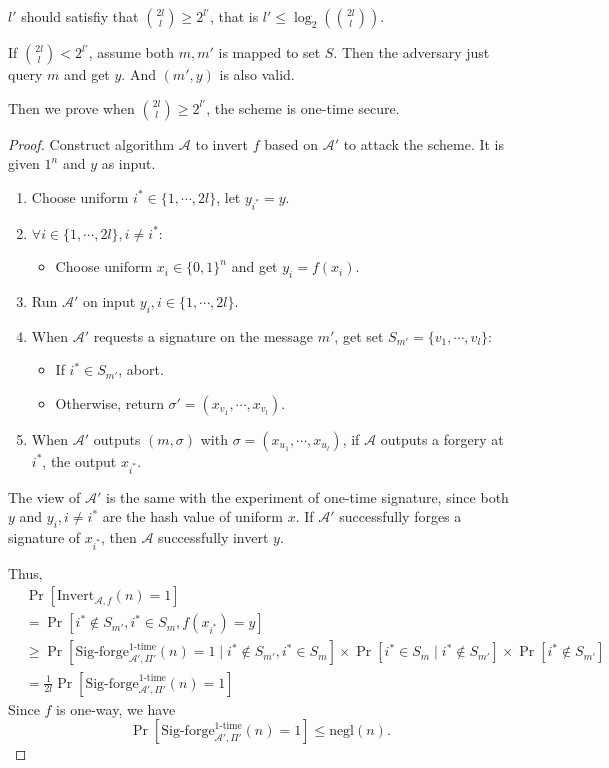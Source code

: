 \documentclass[a4paper]{article}
\newcommand{\negl}{\text{negl}}
\newcommand{\otime}{\text{1-time}}
\newcommand{\Invert}{\text{Invert}}
\newcommand{\A}{\mathcal{A}}
\newenvironment{problem}[2][Problem]{\begin{trivlist}
\item[\hskip \labelsep {\bfseries #1}\hskip \labelsep {\bfseries #2.}]}{\end{trivlist}}
\begin{document}
\begin{problem}{12.11}
$l'$ should satisfiy that $\binom{2l}{l}\ge 2^{l'}$, that is $l'\le\log_2(\binom{2l}{l})$.\par
If $\binom{2l}{l}<2^{l'}$, assume both $m,m'$ is mapped to set $S$. Then the adversary just query $m$ and get $y$. And $(m',y)$ is also valid.\par
Then we prove when $\binom{2l}{l}\ge 2^{l'}$, the scheme is one-time secure.\par
\begin{proof}
Construct algorithm $\A$ to invert $f$ based on $\A'$ to attack the scheme. It is given $1^n$ and $y$ as input.\par
\begin{enumerate}
    \item Choose uniform $i^*\in\{1,\cdots,2l\}$, let $y_{i^*}=y$.
    \item $\forall i\in\{1,\cdots,2l\},i\ne i^*$: 
    \begin{itemize}
        \item Choose uniform $x_i\in\{0,1\}^n$ and get $y_i=f(x_i)$.
    \end{itemize}
    \item Run $\A'$ on input $y_i,i\in\{1,\cdots,2l\}$.
    \item When $\A'$ requests a signature on the message $m'$, get set $S_{m'}=\{v_1,\cdots,v_l\}$:
    \begin{itemize}
        \item If $i^*\in S_{m'}$, abort.
        \item Otherwise, return $\sigma'=(x_{v_1},\cdots,x_{v_l})$.
    \end{itemize}
    \item When $\A'$ outputs $(m,\sigma)$ with $\sigma=(x_{u_1},\cdots,x_{u_l})$, if $\A$ outputs a forgery at $i^*$, the output $x_{i^*}$.
\end{enumerate}\par
The view of $\A'$ is the same with the experiment of one-time signature, since both $y$ and $y_i,i\ne i^*$ are the hash value of uniform $x$. If $\A'$ successfully forges a signature of $x_{i^*}$, then $\A$ successfully invert $y$. \par
Thus, 
\begin{align*}
    &\Pr[\Invert_{\A,f}(n)=1]\\
    &=\Pr[i^*\not\in S_{m'}, i^*\in S_{m},f(x_{i^*})=y]\\
    &\ge\Pr[\text{Sig-forge}_{\A',\Pi'}^{\otime}(n)=1\mid i^*\not\in S_{m'}, i^*\in S_{m}]\times\Pr[i^*\in S_{m}\mid i^*\not\in S_{m'}]\times \Pr[i^*\not\in S_{m'}] \\
    &=\frac{1}{2l}\Pr[\text{Sig-forge}_{\A',\Pi'}^{\otime}(n)=1]
\end{align*}
Since $f$ is one-way, we have $$\Pr[\text{Sig-forge}_{\A',\Pi'}^{\otime}(n)=1]\le\negl(n).$$
\end{proof}
\end{problem}
\end{document}
